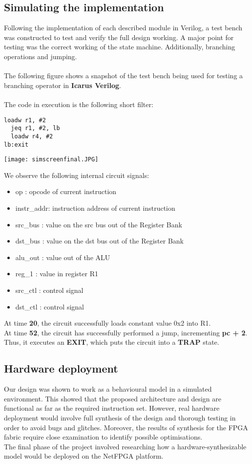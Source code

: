 \documentclass{l4proj}
\begin{document}
\subsection{Simulating the implementation}
Following the implementation of each described module in Verilog, a test bench was constructed to test and verify the full design working. A major point for testing was the correct working of the state machine. Additionally, branching operations and jumping.\\\\
The following figure shows a snapshot of the test bench being used for testing a branching operator in \textbf{Icarus Verilog}.\\\\
The code in execution is the following short filter:
\begin{lstlisting}[language=ebpfAsm]
  loadw r1, #2
  jeq r1, #2, lb  
  loadw r4, #2
lb:exit
\end{lstlisting}
\begin{center}
\texttt{[image: simscreenfinal.JPG]}\\
\end{center}
We observe the following internal circuit signals:
\begin{itemize}
    \item op        : opcode of current instruction
    \item instr\_addr: instruction address of current instruction
    \item src\_bus   : value on the src bus out of the Register Bank
    \item dst\_bus   : value on the dst bus out of the Register Bank
    \item alu\_out   : value out of the ALU
    \item reg\_1     : value in register R1
    \item src\_ctl   : control signal
    \item dst\_ctl   : control signal
\end{itemize}
At time \textbf{20}, the circuit successfully loads constant value 0x2 into R1.\\
At time \textbf{52}, the circuit has successfully performed a jump, incrementing \textbf{pc + 2}. Thus, it executes an \textbf{EXIT}, which puts the circuit into a \textbf{TRAP} state.

\newpage
\subsection{Hardware deployment}
Our design was shown to work as a behavioural model in a simulated environment. This showed that the proposed architecture and design are functional as far as the required instruction set. However, real hardware deployment would involve full synthesis of the design and thorough testing in order to avoid bugs and glitches. Moreover, the results of synthesis for the FPGA fabric require close examination to identify possible optimisations.\\
The final phase of the project involved researching how a hardware-synthesizable model would be deployed on the NetFPGA platform.
\end{document}
